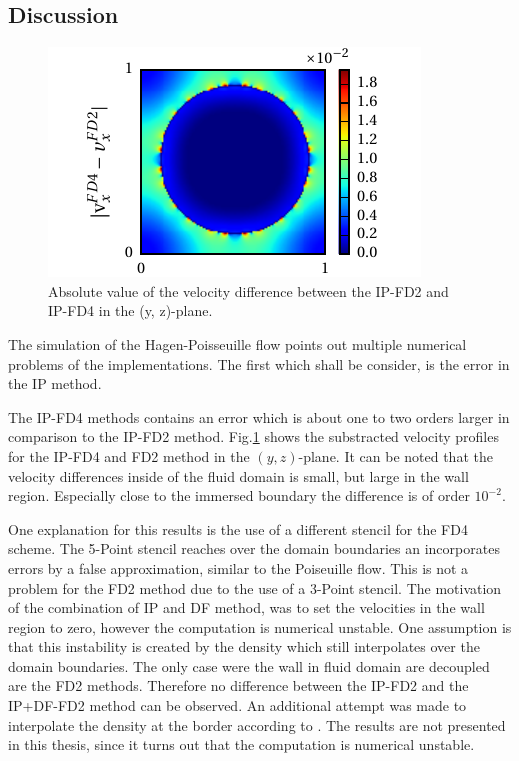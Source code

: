 \clearpage

\subsection{Discussion}

\begin{figure}[!bp]
  \begin{minipage}[c]{0.4\textwidth}
      \centering
      \includegraphics{gfx/immersed_boundary/hpflow/discussion/vzdiff.pdf}
  \end{minipage}
  \begin{minipage}[c]{0.6\textwidth}
      \caption{Absolute value of the velocity difference between the IP-FD2 and IP-FD4 in the (y, z)-plane.
      \label{valid:hpflow_velodiff_discussion}
      }
  \end{minipage}
\end{figure}

The simulation of the Hagen-Poisseuille flow points out multiple numerical problems of the
implementations.
The first which shall be consider, is the error in the IP method.

The IP-FD4 methods contains an error which is about one to two orders larger in comparison to the  IP-FD2 method.
Fig.\ref{valid:hpflow_velodiff_discussion} shows the substracted velocity profiles for the IP-FD4 and FD2 method in the $(y, z)$-plane.
It can be noted that the velocity differences inside of the fluid domain is small, but large in the wall region.
Especially close to the immersed boundary the difference  is of order $10^{-2}$.

One explanation for this results is the use of a different stencil for the FD4 scheme.
The 5-Point stencil reaches over the domain boundaries an incorporates errors by a false approximation, similar to the Poiseuille flow.
This is not a problem for the FD2 method due to the use of a 3-Point stencil.
The motivation of the combination of IP and DF method, was to set the velocities in the wall region to zero,
however the computation is numerical unstable.
One assumption is that this instability is created by the density which still interpolates over the domain boundaries.
The only case were the wall in fluid domain are decoupled are the FD2 methods.
Therefore no difference between the IP-FD2 and the IP+DF-FD2 method can be observed.
An additional attempt was made to interpolate the density at the border according to \citep{Gilmanov2003}.
The results are not presented in this thesis, since it turns out that the computation is numerical unstable.

